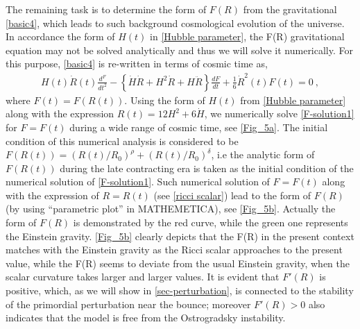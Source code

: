 \documentclass{article}
\begin{document}
 The remaining task is to determine the form of $F(R)$ from the gravitational \ref{basic4}, which 
 leads to such background cosmological evolution of the universe. In accordance the form of $H(t)$ in \ref{Hubble parameter}, 
 the F(R) gravitational equation may 
 not be solved analytically and thus we will solve it numerically. For this purpose, \ref{basic4} is re-written in terms of cosmic time as,
 \begin{eqnarray}
  H(t)\dot{R}(t)\frac{d^F}{dt^2} - \left\{\dot{H}\dot{R} + H^2\dot{R} + H\ddot{R}\right\}\frac{dF}{dt} + \frac{1}{6}\dot{R}^2(t)F(t) = 0~,
  \label{F-solution1}
 \end{eqnarray}
where $F(t) = F(R(t))$. Using the form of $H(t)$ from \ref{Hubble parameter} along with the expression $R(t) = 12H^2 + 6\dot{H}$, we numerically solve 
\ref{F-solution1} for $F = F(t)$ during a wide range of cosmic time, see \ref{Fig_5a}. The initial condition of this numerical analysis 
is considered to be $F(R(t)) = \left(R(t)/R_0\right)^{\rho} + \left(R(t)/R_0\right)^{\delta}$, i.e the analytic form of $F(R(t))$ 
during the late contracting era is taken as the initial condition of the numerical solution of \ref{F-solution1}. Such numerical solution of 
$F= F(t)$ along with the expression of $R = R(t)$ (see \ref{ricci scalar}) lead to the form of $F(R)$ (by using ``parametric plot'' in MATHEMETICA), 
see \ref{Fig_5b}. Actually the form of  $F(R)$ is demonstrated by the red curve, while the green one represents the Einstein gravity. 
\ref{Fig_5b} clearly depicts that the F(R) in the present context matches with the Einstein gravity as the Ricci scalar approaches to the present value, 
while the F(R) seems to deviate from the usual Einstein gravity, when the scalar curvature takes larger and larger values. 
It is evident that $F'(R)$ is positive, which, as we will show in 
\ref{sec-perturbation}, is connected to the stability of the primordial perturbation near the bounce; moreover $F'(R) > 0$ 
also indicates that the model is free from the Ostrogradsky instability.\\
\end{document}

